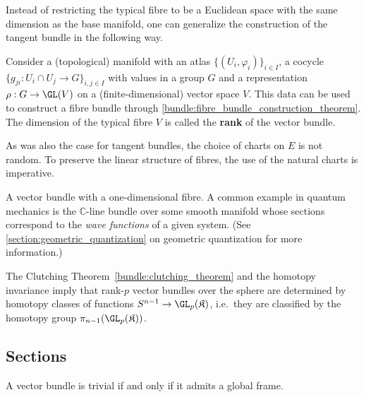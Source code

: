     Instead of restricting the typical fibre to be a Euclidean space with the same dimension as the base manifold, one can generalize the construction of the tangent bundle in the following way.
    \begin{construct}\label{bundle:vector_bundle_construction}
        Consider a (topological) manifold with an atlas $\{(U_i,\varphi_i)\}_{i\in I}$, a cocycle $\{g_{ji}:U_i\cap U_j\rightarrow G\}_{i,j\in I}$ with values in a group $G$ and a representation $\rho:G\rightarrow\GL(V)$ on a (finite-dimensional) vector space $V$. This data can be used to construct a fibre bundle through \cref{bundle:fibre_bundle_construction_theorem}. The dimension of the typical fibre $V$ is called the \textbf{rank} of the vector bundle.
    \end{construct}
    \begin{remark}
        As was also the case for tangent bundles, the choice of charts on $E$ is not random. To preserve the linear structure of fibres, the use of the natural charts is imperative.
    \end{remark}

    \begin{example}
        A vector bundle with a one-dimensional fibre. A common example in quantum mechanics is the $\mathbb{C}$-line bundle over some smooth manifold whose sections correspond to the \textit{wave functions} of a given system. (See \cref{section:geometric_quantization} on geometric quantization for more information.)
    \end{example}

    \begin{property}\label{bundle:vector_bundles_over_sphere}
        The Clutching Theorem~\ref{bundle:clutching_theorem} and the homotopy invariance imply that rank-$p$ vector bundles over the sphere are determined by homotopy classes of functions $S^{n-1}\rightarrow\GL_p(\mathfrak{K})$, i.e.~they are classified by the homotopy group $\pi_{n-1}(\GL_p(\mathfrak{K}))$.
    \end{property}

\subsection{Sections}

    \begin{property}\label{bundle:trivial_vector_bundle}
        A vector bundle is trivial if and only if it admits a global frame.
    \end{property}

